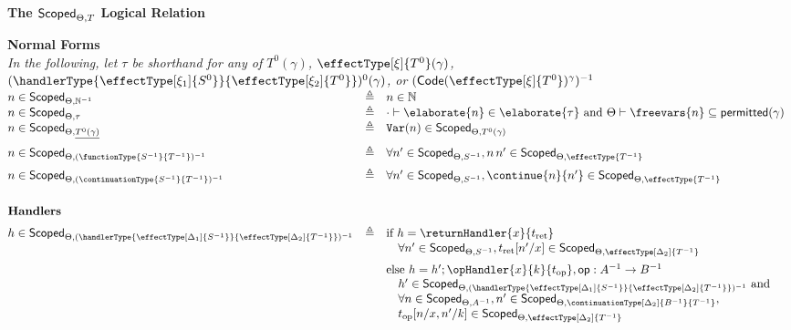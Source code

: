 \begin{figure}
\begin{rec-desc}
  {\large\textbf{The $\textsf{Scoped}_{{\Theta}, {T}}$ Logical Relation}}
  \vspace{5mm}
  
  \textbf{Normal Forms} \\
    {\scriptsize{\textit{In the following, let $\tau$ be shorthand for any of $T^{0} (\gamma)$, $\effectType[\xi]{T^{0}} (\gamma)$, $(\handlerType{\effectType[\xi_1]{S^0}}{\effectType[\xi_2]{T^0}})^{0}(\gamma)$, or ${(\textsf{Code}(\effectType[\xi]{T^0})^{\gamma})^{-1}}$}}}\\
    
  $
  \begin{array}{@{}lllr}
    n \in \scoped{\mathbb{N}^{-1}} & \triangleq & n \in \mathbb{N} \\ 
    n \in \scoped{{\tau}} & \triangleq & \cdot \vdash \elaborate{n} \in \elaborate{\tau} \text{ and } \Theta \vdash \freevars{n} \subseteq \textsf{permitted}(\gamma) \\
    \vspace{2mm}
    n \in \scoped{\underline{{T}^{0}(\gamma)}} & \triangleq & \texttt{Var}({n}) \in \scoped{{T^{0}} (\gamma)} \\ \vspace{2mm}
    n \in \scoped{(\functionType{{S}^{-1}}{{T}^{-1}})^{-1}} & \triangleq & \forall n' \in \scoped{{S}^{-1}}, n \, n' \in \scoped{\effectType{T^{-1}}} \\ \vspace{2mm}
    n \in \scoped{(\continuationType{{S}^{-1}}{{T}^{-1}})^{-1}} & \triangleq & \forall n' \in \scoped{{S}^{-1}}, \continue{n}{n'} \in \scoped{\effectType{T^{-1}}} \\\\ \vspace{2mm}
    \textbf{Handlers} \\
    h \in \scoped{(\handlerType{\effectType[\Delta_1]{{S}^{-1}}}{\effectType[\Delta_2]{{T}^{-1}}})^{-1}} & \triangleq & \text{if } h = \returnHandler{x}{t_{\text{ret}}}\\ \vspace{2mm}
    && \quad \forall n' \in \scoped{{S}^{-1}}, t_{\text{ret}}[n'/x] \in \scoped{\effectType[\Delta_2]{T^{-1}}} \\
    && \text{else } h = h'; \opHandler{x}{k}{t_{\text{op}}}, \textsf{op}: A^{-1} \to B^{-1} \\
    && \quad h' \in \scoped{(\handlerType{\effectType[\Delta_1]{{S}^{-1}}}{\effectType[\Delta_2]{{T}^{-1}}})^{-1}} \text{ and}\\ 
    && \quad \forall n \in \scoped{{A}^{-1}}, n' \in \scoped{\continuationType[\Delta_2]{{B}^{-1}}{T^{-1}}}, \\ && \quad t_{\text{op}}[n/x, n'/k] \in \scoped{\effectType[\Delta_2]{T^{-1}}}\\\\
  \end{array}
$


\end{rec-desc}
\end{figure}

